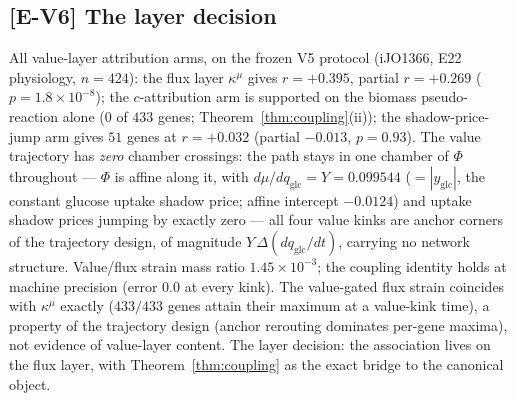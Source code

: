 \documentclass[11pt,a4paper]{article}
\theoremstyle{plain}
\theoremstyle{definition}
\theoremstyle{remark}
\newcommand{\kmu}{\kappa^{\mu}}
\begin{document}
\subsection{[E-V6] The layer decision}
All value-layer attribution arms, on the frozen V5 protocol (iJO1366,
E22 physiology, $n = 424$): the flux layer $\kmu$ gives $r = +0.395$,
partial $r = +0.269$ ($p = 1.8 \times 10^{-8}$); the $c$-attribution
arm is supported on the biomass pseudo-reaction alone ($0$ of $433$
genes; Theorem~\ref{thm:coupling}(ii)); the shadow-price-jump arm
gives $51$ genes at $r = +0.032$ (partial $-0.013$, $p = 0.93$). The
value trajectory has \emph{zero} chamber crossings: the path stays in
one chamber of $\Phi$ throughout --- $\Phi$ is affine along it, with
$d\mu/dq_{\mathrm{glc}} = Y = 0.099544$ ($= |y_{\mathrm{glc}}|$, the
constant glucose uptake shadow price; affine intercept $-0.0124$) and
uptake shadow prices jumping by exactly zero --- all four value kinks
are anchor corners of the trajectory design, of magnitude
$Y\,\Delta(dq_{\mathrm{glc}}/dt)$, carrying no network structure. Value/flux strain mass ratio
$1.45 \times 10^{-3}$; the coupling identity holds at machine
precision (error $0.0$ at every kink). The value-gated flux strain
coincides with $\kmu$ exactly ($433/433$ genes attain their maximum
at a value-kink time), a property of the trajectory design (anchor
rerouting dominates per-gene maxima), not evidence of value-layer
content. The layer decision: the association lives on the flux layer,
with Theorem~\ref{thm:coupling} as the exact bridge to the canonical
object.
\end{document}

